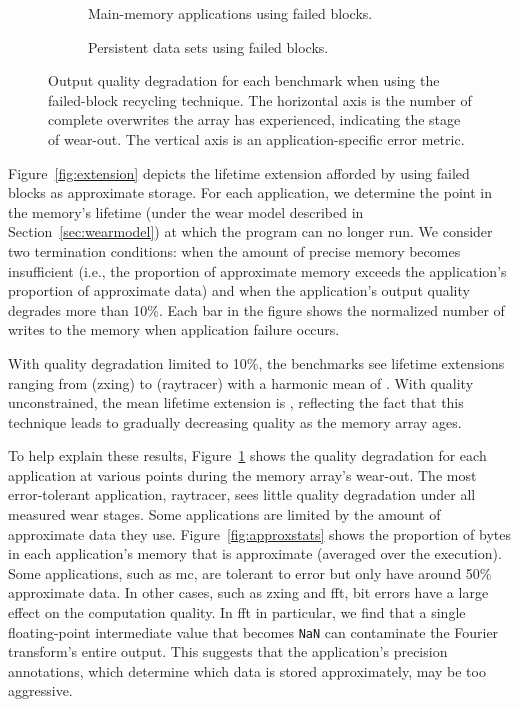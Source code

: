 \documentclass[prodmode,acmtocs]{acmsmall}
\begin{document}
\begin{figure}
    \begin{subfigure}[b]{0.5\columnwidth}
        \centering
        
        \caption{
            Main-memory applications using failed blocks.
        }
        \label{fig:qos-p-tb}
    \end{subfigure}
    \begin{subfigure}[b]{0.5\columnwidth}
        \centering
        
        \caption{
            Persistent data sets using failed blocks.
        }
        \label{fig:nv-qos-tb}
    \end{subfigure}
    \caption{
        Output quality degradation for each benchmark when using the
        failed-block recycling technique. The horizontal axis is the number of
        complete overwrites the array has experienced, indicating the stage of
        wear-out. The vertical axis is an application-specific error metric.
    }
\end{figure}

Figure~\ref{fig:extension} depicts the lifetime extension afforded by
using failed blocks as approximate storage. For
each application, we determine the point in the memory's lifetime
(under the wear model described in Section~\ref{sec:wearmodel}) at
which the program can no longer run. We consider two termination
conditions: when the amount of
precise memory becomes insufficient (i.e., the proportion of
approximate memory exceeds the application's proportion of approximate
data) and when the application's output quality degrades more than 10\%. Each bar in
the figure shows the normalized number of writes to the memory when
application failure occurs.

With quality degradation limited to 10\%, the benchmarks see lifetime
extensions ranging from  (\textsf{zxing}) to
 (\textsf{raytracer}) with
a harmonic mean of . With quality unconstrained, the mean lifetime
extension is , reflecting the fact that this technique leads to gradually
decreasing quality as the memory array ages.

To help explain these results, Figure~\ref{fig:qos-p-tb} shows the quality
degradation for each application at various points during the memory array's
wear-out.
The most error-tolerant application, \textsf{raytracer}, sees
little quality degradation under all measured wear stages.
Some applications are limited by the amount of approximate data they use.
Figure~\ref{fig:approxstats} shows the proportion of bytes in each
application's memory that is approximate (averaged over the execution).
Some applications,
such as \textsf{mc}, are tolerant to error but only have around 50\%
approximate data. In other
cases, such as \textsf{zxing} and \textsf{fft}, bit errors
have a large effect on the computation quality. In \textsf{fft} in
particular, we find that a single floating-point intermediate value that
becomes \verb+NaN+ can contaminate the Fourier transform's entire output.
This suggests that the application's precision
annotations, which determine which data is stored approximately, may be
too aggressive.
\end{document}
